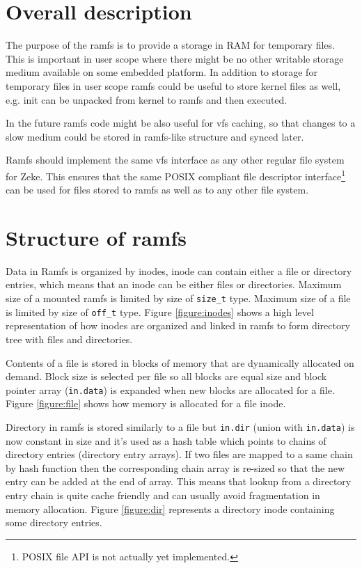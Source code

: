 \section{Overall description}

The purpose of the \acs{ramfs} is to provide a storage in RAM for temporary
files. This is important in user scope where there might be no other writable
storage medium available on some embedded platform. In addition to storage
for temporary files in user scope ramfs could be useful to store kernel files
as well, e.g. init can be unpacked from kernel to ramfs and then executed.

In the future ramfs code might be also useful for \acs{vfs} caching, so that
changes to a slow medium could be stored in ramfs-like structure and synced
later.

Ramfs should implement the same \acs{vfs} interface as any other regular
file system for Zeke. This ensures that the same POSIX compliant file
descriptor interface\footnote{POSIX file API is not actually yet implemented.}
can be used for files stored to ramfs as well as to any other file system.

\section{Structure of ramfs}

Data in Ramfs is organized by inodes, \acs{inode} can contain either a file or
directory entries, which means that an inode can be either files or directories.
Maximum size of a mounted ramfs is limited by size of \verb+size_t+ type.
Maximum size of a file is limited by size of \verb+off_t+ type. Figure
\ref{figure:inodes} shows a high level representation of how inodes are
organized and linked in ramfs to form directory tree with files and directories.

Contents of a file is stored in blocks of memory that are dynamically allocated
on demand. Block size is selected per file so all blocks are equal size and
block pointer array (\verb+in.data+) is expanded when new blocks are allocated
for a file. Figure \ref{figure:file} shows how memory is allocated for a file
inode.

Directory in ramfs is stored similarly to a file but \verb+in.dir+ (union with
\verb+in.data+) is now constant in size and it's used as a hash table which
points to chains of directory entries (directory entry arrays). If two files are
mapped to a same chain by hash function then the corresponding chain array is
re-sized so that the new entry can be added at the end of array. This means that
lookup from a directory entry chain is quite cache friendly and can usually
avoid fragmentation in memory allocation. Figure \ref{figure:dir} represents a
directory inode containing some directory entries.

